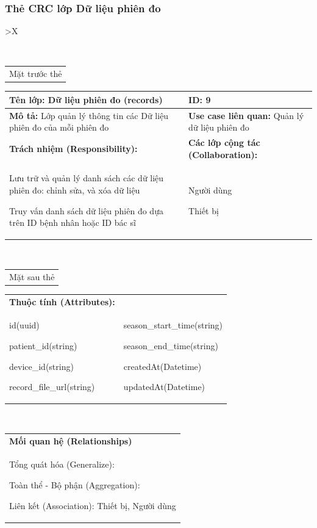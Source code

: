 \subsubsection{Thẻ CRC lớp Dữ liệu phiên đo}

\begin{xltabular}{\textwidth}{
		>{\centering\arraybackslash}X
	}
	\caption{\bfseries \fontsize{12pt}{0pt}\selectfont Thẻ CRC lớp Dữ liệu phiên đo}
	\\
	\begin{tabularx}{0.9\textwidth}{X}
		Mặt trước thẻ
	\end{tabularx}
	\begin{tabularx}{0.9\textwidth}{|X|X|}
		\hline
		\textbf{Tên lớp:} Dữ liệu phiên đo (records)                                & \textbf{ID:} 9                                         \\
		\hline
		\textbf{Mô tả:} Lớp quản lý thông tin các Dữ liệu phiên đo của mỗi phiên đo & \textbf{Use case liên quan:}  Quản lý dữ liệu phiên đo \\
		\hline
		\textbf{Trách nhiệm (Responsibility):}                                      & \textbf{Các lớp cộng tác (Collaboration):}             \\
		Lưu trữ và quản lý danh sách các dữ liệu phiên đo: chỉnh sửa, và xóa dữ liệu

		Truy vấn danh sách dữ liệu phiên đo dựa trên ID bệnh nhân hoặc ID bác sĩ
		                                                                            &
		Người dùng

		Thiết bị
		\\
		\hline
	\end{tabularx}
	\\
	\begin{tabularx}{0.9\textwidth}{X}
		Mặt sau thẻ
	\end{tabularx}
	\begin{tabularx}{0.9\textwidth}{|X|X|}
		\hline
		\textbf{Thuộc tính (Attributes):} & \\
		id(uuid)

		patient\_id(string)

		device\_id(string)

		record\_file\_url(string)
		                                  &
		season\_start\_time(string)

		season\_end\_time(string)

		createdAt(Datetime)

		updatedAt(Datetime)
		\\ \hline
	\end{tabularx}
	\\
	\begin{tabularx}{0.9\textwidth}{|X|}
		\hline
		\textbf{Mối quan hệ (Relationships)} \\
		Tổng quát hóa (Generalize):

		Toàn thể - Bộ phận (Aggregation):

		Liên kết (Association): Thiết bị, Người dùng
		\\
		\hline
	\end{tabularx}
\end{xltabular}

